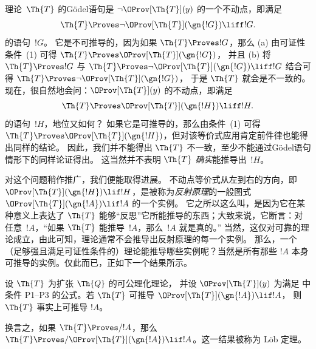 \documentclass[../../../include/open-logic-section]{subfiles}
\begin{document}


理论~$\Th{T}$ 的Gödel语句是 $\lnot
\OProv[\Th{T}](y)$ 的一个不动点，即满足 \[
\Th{T} \Proves \lnot \OProv[\Th{T}](\gn{!G}) \liff !G.
\] 的语句~$!G$。
它是不可推导的，因为如果 $\Th{T} \Proves !G$，那么 (a) 由可证性条件~(1) 可得 $\Th{T} \Proves \OProv[\Th{T}](\gn{!G})$，
并且 (b) 将 $\Th{T} \Proves !G$ 与 $\Th{T} \Proves \lnot \OProv[\Th{T}](\gn{!G})
\liff !G$ 结合可得 $\Th{T} \Proves \lnot \OProv[\Th{T}](\gn{!G})$，
于是 $\Th{T}$ 就会是不一致的。
现在，很自然地会问：$\OProv[\Th{T}](y)$ 的不动点，即满足 \[
\Th{T} \Proves \OProv[\Th{T}](\gn{!H}) \liff !H.
\] 的语句~$!H$，地位又如何？
如果它是可推导的，那么由条件~(1) 可得 $\Th{T} \Proves \OProv[\Th{T}](\gn{!H})$，但对该等价式应用肯定前件律也能得出同样的结论。
因此，我们并不能得出 $\Th{T}$ 不一致，至少不能通过Gödel语句情形下的同样论证得出。
这当然并不表明 $\Th{T}$ \emph{确实}能推导出~$!H$。

对这个问题稍作推广，我们便能取得进展。
不动点等价式从左到右的方向，即 $\OProv[\Th{T}](\gn{!H}) \lif !H$，是被称为\emph{反射原理}的一般图式 $\OProv[\Th{T}](\gn{!A}) \lif !A$ 的一个实例。
它之所以这么叫，是因为它在某种意义上表达了 $\Th{T}$ 能够“反思”它所能推导的东西；大致来说，它断言：对任意~$!A$，“如果 $\Th{T}$ 能推导~$!A$，那么~$!A$ 就是真的。”
当然，这仅对可靠的理论成立，由此可知，理论通常不会推导出反射原理的每一个实例。
那么，一个（足够强且满足可证性条件的）理论能推导哪些实例呢？当然是所有那些 $!A$ 本身可推导的实例。仅此而已，正如下一个结果所示。

\begin{thm}
设 $\Th{T}$ 为扩张 $\Th{Q}$ 的可公理化理论，
并设 $\OProv[\Th{T}](y)$ 为满足
 中条件 P1--P3 的公式。若 $\Th{T}$ 可推导 $\OProv[\Th{T}](\gn{!A}) \lif !A$，
则 $\Th{T}$ 事实上可推导 $!A$。
\end{thm}

换言之，如果 $\Th{T} \Proves/ !A$，那么 $\Th{T} \Proves/
\OProv[\Th{T}](\gn{!A}) \lif !A$。这一结果被称为 L\"ob 定理。
\end{document}
